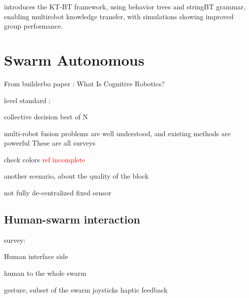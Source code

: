 \cite{venkata2023kt} introduces the KT-BT framework, using behavior trees and stringBT grammar, enabling multirobot knowledge transfer, with simulations showing improved group performance.


\section{Swarm Autonomous}

From builderbo paper :
What Is Cognitive Robotics?
\cite{cangelosi2022cognition} 
\cite{vernon2014artificial} 
\cite{heinrich2022swarm}
\cite{khaluf2019neglected}

level standard :
\cite{sae2021automated}

collective decision
\cite{valentini2017best} best of N
\cite{dorigo2014self}
\cite{valentini2016collective}

multi-robot fusion problems are well understood, and existing methods are powerful
These are all surveys
\cite{yan2013survey} 
\cite{sun2017multi}
\cite{rizk2019cooperative}
\cite{li2021multi}

check colors
\cite{strobel2018managing} \textcolor{red}{ref incomplete}
\cite{ebert2018multi}
\cite{shan2020collective}
\cite{bartashevich2019benchmarking}
\cite{shan2021discrete}

another scenario, about the quality of the block
\cite{prasetyo2018best}
\cite{prasetyo2019collective}
\cite{khaluf2017edge} 
\cite{wahby2019collective}
\cite{khaluf2020construction}
\cite{capitan2013decentralized}

not fully de-centralized
\cite{mirzaei2007performance} fixed sensor
\cite{rodrigues2015beyond}
\cite{stroupe2001distributed}
\cite{zadorozhny2013information}
\cite{sasaoka2016multi}
\cite{czarnetzki2010handling}
\cite{otte2016collective}
\cite{kornienko2005cognitive}
\cite{giusti2012cooperative}

\subsection{Human-swarm interaction}

survey:
\cite{siean2023opportunities}
\cite{kolling2015human}

Human interface side
\cite{jarvis2025first}
\cite{abioye2025user}
\cite{alonso2015gesture}

human to the whole swarm
\cite{ayanian2014controlling}
\cite{alonso2015gesture}
\cite{macchini2021personalized}

\cite{podevijn2013gesturing} gesture, subset of the swarm
\cite{zhou2016assistive} joysticks
\cite{lee2013semiautonomous} haptic feedback

